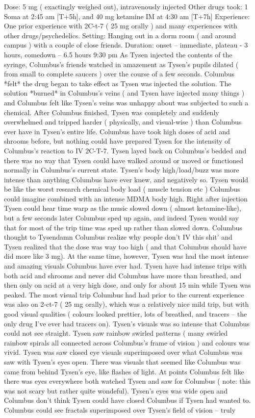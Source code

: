 \documentclass[12pt]{book}
\begin{document}
Dose: 5 mg ( exactingly weighed out), intravenously injected Other drugs took: 1 Soma at 2:45 am [T+5h], and 40 mg ketamine IM at 4:30 am [T+7h] Experience: One prior experience with 2C-t-7 ( 25 mg orally ) and many experiences with other drugs/psychedelics. Setting: Hanging out in a dorm room ( and around campus ) with a couple of close friends. Duration: onset -- immediate, plateau - 3 hours, comedown -- 6.5 hours 9:30 pm As Tysen injected the contents of the syringe, Columbus's friends watched in amazement as Tysen's pupils dilated ( from small to complete saucers ) over the course of a few seconds. Columbus *felt* the drug began to take effect as Tysen was injected the solution. The solution *burned* in Columbus's veins ( and Tysen have injected many things ) and Columbus felt like Tysen's veins was unhappy about was subjected to such a chemical. After Columbus finished, Tysen was completely and suddenly overwhelmed and tripped harder ( physically, and visual-wise ) than Columbus ever have in Tysen's entire life. Columbus have took high doses of acid and shrooms before, but nothing could have prepared Tysen for the intensity of Columbus's reaction to IV 2C-T-7. Tysen layed back on Columbus's bedded and there was no way that Tysen could have walked around or moved or functioned normally in Columbus's current state. Tysen's body high/load/buzz was more intense than anything Columbus have ever knew, and negatively so. Tysen would be like the worst research chemical body load ( muscle tension etc ) Columbus could imagine combined with an intense MDMA body high. Right after injection Tysen could hear time warp as the music slowed down ( almost ketamine-like), but a few seconds later Columbus sped up again, and indeed Tysen would say that for most of the trip time was sped up rather than slowed down. Columbus thought to Tysendamn Columbus realize why people don't IV this shit' and Tysen realized that the dose was way too high ( and that Columbus should have did more like 3 mg). At the same time, however, Tysen was had the most intense and amazing visuals Columbus have ever had. Tysen have had intense trips with both acid and shrooms and never did Columbus have more than breathed, and then only on acid at a very high dose, and only for about 15 min while Tysen was peaked. The most visual trip Columbus had had prior to the current experience was also on 2-ct-7 ( 25 mg orally), which was a relatively nice mild trip, but with good visual qualities ( colours looked prettier, lots of breathed, and tracers -- the only drug I've ever had tracers on). Tysen's visuals was so intense that Columbus could not see straight. Tysen saw rainbow swirled patterns ( many swirled rainbow spirals all connected across Columbus's frame of vision ) and colours was vivid. Tysen was saw closed eye visuals superimposed over what Columbus was saw with Tysen's eyes open. There was visuals that seemed like Columbus was came from behind Tysen's eye, like flashes of light. At points Columbus felt like there was eyes everywhere both watched Tysen and saw for Columbus ( note: this was not scary but rather quite wondeful). Tysen's eyes was wide open and Columbus don't think Tysen could have closed Columbus if Tysen had wanted to. Columbus could see fractals superimposed over Tysen's field of vision -- truly 
\end{document}
